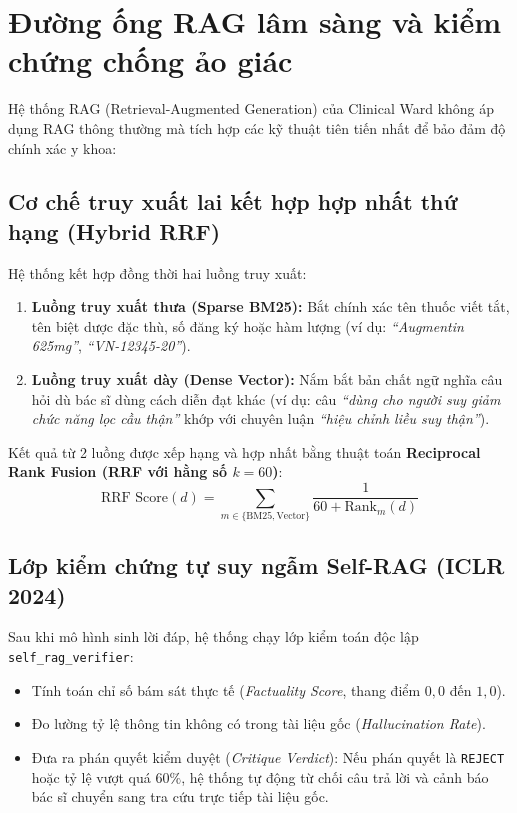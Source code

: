 \documentclass[12pt,a4paper]{article}
\begin{document}
\section{Đường ống RAG lâm sàng và kiểm chứng chống ảo giác}

Hệ thống RAG (Retrieval-Augmented Generation) của Clinical Ward không áp dụng RAG thông thường mà tích hợp các kỹ thuật tiên tiến nhất để bảo đảm độ chính xác y khoa:

\subsection{Cơ chế truy xuất lai kết hợp hợp nhất thứ hạng (Hybrid RRF)}
Hệ thống kết hợp đồng thời hai luồng truy xuất:
\begin{enumerate}[leftmargin=1.5em]
    \item \textbf{Luồng truy xuất thưa (Sparse BM25):} Bắt chính xác tên thuốc viết tắt, tên biệt dược đặc thù, số đăng ký hoặc hàm lượng (ví dụ: \textit{``Augmentin 625mg''}, \textit{``VN-12345-20''}).
    \item \textbf{Luồng truy xuất dày (Dense Vector):} Nắm bắt bản chất ngữ nghĩa câu hỏi dù bác sĩ dùng cách diễn đạt khác (ví dụ: câu \textit{``dùng cho người suy giảm chức năng lọc cầu thận''} khớp với chuyên luận \textit{``hiệu chỉnh liều suy thận''}).
\end{enumerate}
Kết quả từ 2 luồng được xếp hạng và hợp nhất bằng thuật toán \textbf{Reciprocal Rank Fusion (RRF với hằng số $k=60$)}:
$$\text{RRF Score}(d) = \sum_{m \in \{\text{BM25}, \text{Vector}\}} \frac{1}{60 + \text{Rank}_m(d)}$$

\subsection{Lớp kiểm chứng tự suy ngẫm Self-RAG (ICLR 2024)}
Sau khi mô hình sinh lời đáp, hệ thống chạy lớp kiểm toán độc lập \texttt{self\_rag\_verifier}:
\begin{itemize}[leftmargin=1.5em]
    \item Tính toán chỉ số bám sát thực tế (\textit{Factuality Score}, thang điểm $0,0$ đến $1,0$).
    \item Đo lường tỷ lệ thông tin không có trong tài liệu gốc (\textit{Hallucination Rate}).
    \item Đưa ra phán quyết kiểm duyệt (\textit{Critique Verdict}): Nếu phán quyết là \texttt{REJECT} hoặc tỷ lệ vượt quá $60\%$, hệ thống tự động từ chối câu trả lời và cảnh báo bác sĩ chuyển sang tra cứu trực tiếp tài liệu gốc.
\end{itemize}
\end{document}
